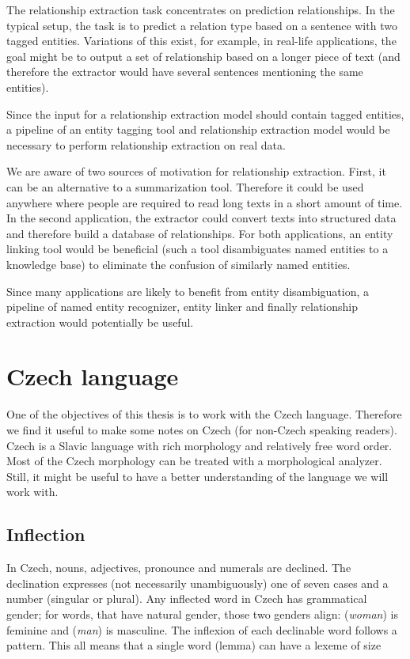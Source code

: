 The relationship extraction task concentrates on prediction relationships. In the typical setup, the task is to predict a relation type based on a sentence with two tagged entities. Variations of this exist, for example, in real-life applications, the goal might be to output a set of relationship based on a longer piece of text (and therefore the extractor would have several sentences mentioning the same entities). 

Since the input for a relationship extraction model should contain tagged entities, a pipeline of an entity tagging tool and relationship extraction model would be necessary to perform relationship extraction on real data. 

We are aware of two sources of motivation for relationship extraction. First, it can be an alternative to a summarization tool. Therefore it could be used anywhere where people are required to read long texts in a short amount of time. In the second application, the extractor could convert texts into structured data and therefore build a database of relationships. For both applications, an entity linking tool would be beneficial (such a tool disambiguates named entities to a knowledge base) to eliminate the confusion of similarly named entities.

Since many applications are likely to benefit from entity disambiguation, a pipeline of named entity recognizer, entity linker and finally relationship extraction would potentially be useful.

\section{Czech language}
One of the objectives of this thesis is to work with the Czech language. Therefore we find it useful to make some notes on Czech (for non-Czech speaking readers). Czech is a Slavic language with rich morphology and relatively free word order. Most of the Czech morphology can be treated with a morphological analyzer. Still, it might be useful to have a better understanding of the language we will work with.

\subsection{Inflection}
In Czech, nouns, adjectives, pronounce and numerals are declined. The declination expresses (not necessarily unambiguously) one of seven cases and a number (singular or plural). Any inflected word in Czech has grammatical gender; for words, that have natural gender, those two genders align:  (\textit{woman}) is feminine and  (\textit{man}) is masculine. The inflexion of each declinable word follows a pattern. This all means that a single word (lemma) can have a lexeme of size 

